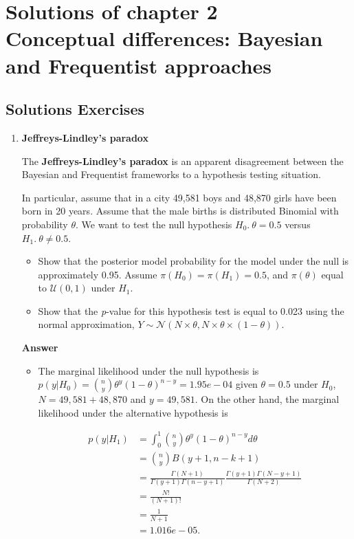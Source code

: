 \chapter{Solutions of chapter 2\\
Conceptual differences: Bayesian and Frequentist approaches}\label{chap2}
\section{Solutions Exercises}\label{sec21}
\begin{enumerate}[leftmargin=*]
\item \textbf{Jeffreys-Lindley's paradox}

The \textbf{Jeffreys-Lindley's paradox} \cite{Jeffreys1961,lindley1957statistical} is an apparent disagreement between the Bayesian and Frequentist frameworks to a hypothesis testing situation.

In particular, assume that in a city 49,581 boys and 48,870 girls have been born in 20 years. Assume that the male births is distributed Binomial with probability $\theta$. We want to test the null hypothesis $H_0. \ \theta=0.5$ versus $H_1. \ \theta\neq 0.5$.

\begin{itemize}
	\item Show that the posterior model probability for the model under the null is approximately 0.95. Assume $\pi(H_0)=\pi(H_1)=0.5$, and $\pi(\theta)$ equal to $\mathcal{U}(0,1)$ under $H_1$.
	\item Show that the \textit{p}-value for this hypothesis test is equal to 0.023 using the normal approximation, $Y\sim \mathcal{N}(N\times \theta, N\times \theta \times (1-\theta))$. 
\end{itemize}

\textbf{Answer}

\begin{itemize}
	\item The marginal likelihood under the null hypothesis is $p(y|H_0)={n \choose y}\theta^y(1-\theta)^{n-y}=1.95e-04$ given $\theta=0.5$ under $H_0$, $N=49,581+48,870$ and $y=49,581$. On the other hand, the marginal likelihood under the alternative hypothesis is

\begin{align*}
	p(y|H_1)&=\int_{0}^{1}{n \choose y}\theta^y(1-\theta)^{n-y}d\theta\\
	&={n \choose y} B(y+1, n-k+1)\\
	&=\frac{\Gamma(N+1)}{\Gamma(y+1)\Gamma(n-y+1)}\frac{\Gamma(y+1)\Gamma(N-y+1)}{\Gamma(N+2)}\\
	&=\frac{N!}{(N+1)!}\\
	&=\frac{1}{N+1}\\
	&=1.016e-05. 
\end{align*}


\end{itemize}
\end{enumerate}
